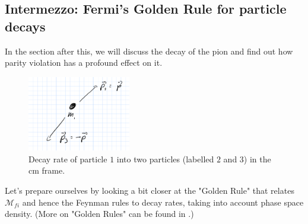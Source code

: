 \subsection{Intermezzo: Fermi's Golden Rule for particle decays}
In the section after this, we will discuss the decay of the pion and find out how parity violation has a profound effect on it. 
\begin{figure}
\centering
\includegraphics[width=0.4\textwidth]{fig/weak/Decay122}
\caption{Decay rate of particle $1$ into two particles (labelled $2$ and $3$) in the cm frame.\label{fig:Decay122}}
\end{figure}
Let's prepare ourselves by looking a bit closer at the "Golden Rule" that relates $\mathcal{M}_{fi}$ and hence the Feynman rules to decay rates, taking into account phase space density. (More on "Golden Rules" can be found in .)
